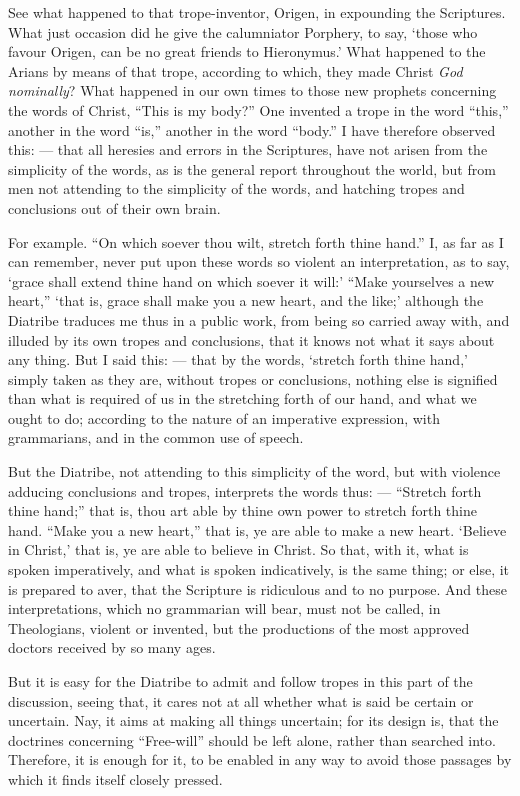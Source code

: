 See what happened to that trope-inventor, Origen, in expounding the Scriptures. What just occasion did he give the calumniator Porphery, to say, ‘those who favour Origen, can be no great friends to Hieronymus.’ What happened to the Arians by means of that trope, according to which, they made Christ \emph{God nominally}? What happened in our own times to those new prophets concerning the words of Christ, “This is my body?” One invented a trope in the word “this,” another in the word “is,” another in the word “body.” I have therefore observed this: — that all heresies and errors in the Scriptures, have not arisen from the simplicity of the words, as is the general report throughout the world, but from men not attending to the simplicity of the words, and hatching tropes and conclusions out of their own brain.

For example. “On which soever thou wilt, stretch forth thine hand.” I, as far as I can remember, never put upon these words so violent an interpretation, as to say, ‘grace shall extend thine hand on which soever it will:’ “Make yourselves a new heart,” ‘that is, grace shall make you a new heart, and the like;’ although the Diatribe traduces me thus in a public work, from being so carried away with, and illuded by its own tropes and conclusions, that it knows not what it says about any thing. But I said this: — that by the words, ‘stretch forth thine hand,’ simply taken as they are, without tropes or conclusions, nothing else is signified than what is required of us in the stretching forth of our hand, and what we ought to do; according to the nature of an imperative expression, with grammarians, and in the common use of speech.

But the Diatribe, not attending to this simplicity of the word, but with violence adducing conclusions and tropes, interprets the words thus: — “Stretch forth thine hand;” that is, thou art able by thine own power to stretch forth thine hand. “Make you a new heart,” that is, ye are able to make a new heart. ‘Believe in Christ,’ that is, ye are able to believe in Christ. So that, with it, what is spoken imperatively, and what is spoken indicatively, is the same thing; or else, it is prepared to aver, that the Scripture is ridiculous and to no purpose. And these interpretations, which no grammarian will bear, must not be called, in Theologians, violent or invented, but the productions of the most approved doctors received by so many ages.

But it is easy for the Diatribe to admit and follow tropes in this part of the discussion, seeing that, it cares not at all whether what is said be certain or uncertain. Nay, it aims at making all things uncertain; for its design is, that the doctrines concerning “Free-will” should be left alone, rather than searched into. Therefore, it is enough for it, to be enabled in any way to avoid those passages by which it finds itself closely pressed.

